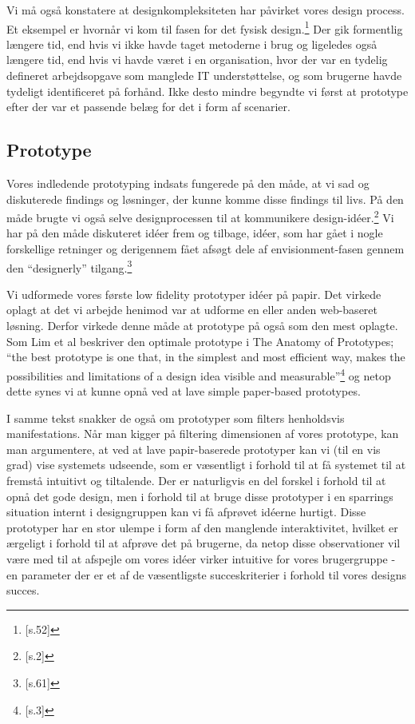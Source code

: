 Vi må også konstatere at designkompleksiteten har påvirket vores design process. Et eksempel er hvornår vi kom til fasen for det fysisk design.\footnote{\citep{Benyon}[s.52]} Der gik formentlig længere tid, end hvis vi ikke havde taget metoderne i brug og ligeledes også længere tid, end hvis vi havde været i en organisation, hvor der var en tydelig defineret arbejdsopgave som manglede IT understøttelse, og som brugerne havde tydeligt identificeret på forhånd. Ikke desto mindre begyndte vi først at prototype efter der var et passende belæg for det i form af scenarier.

\subsection{Prototype}
Vores indledende prototyping indsats fungerede på den måde, at vi sad og diskuterede findings og løsninger, der kunne komme disse findings til livs. På den måde brugte vi også selve designprocessen til at kommunikere design-idéer.\footnote{\citep{Lim}[s.2]} Vi har på den måde diskuteret idéer frem og tilbage, idéer, som har gået i nogle forskellige retninger og derigennem fået afsøgt dele af envisionment-fasen gennem den “designerly” tilgang.\footnote{\citep{Stolterman}[s.61]}

Vi udformede vores første low fidelity prototyper idéer på papir. Det virkede oplagt at det vi arbejde henimod var at udforme en eller anden web-baseret løsning. Derfor virkede denne måde at prototype på også som den mest oplagte. Som Lim et al beskriver den optimale prototype i The Anatomy of Prototypes; “the best prototype is one that, in the simplest and most efficient way, makes the possibilities and limitations of a design idea visible and measurable”\footnote{\citep{Lim}[s.3]} og netop dette synes vi at kunne opnå ved at lave simple paper-based prototypes. 

I samme tekst snakker de også om prototyper som filters henholdsvis manifestations. Når man kigger på filtering dimensionen af vores prototype, kan man argumentere, at ved at lave papir-baserede prototyper kan vi (til en vis grad) vise systemets udseende, som er væsentligt i forhold til at få systemet til at fremstå intuitivt og tiltalende. Der er naturligvis en del forskel i forhold til at opnå det gode design, men i forhold til at bruge disse prototyper i en sparrings situation internt i designgruppen kan vi få  afprøvet idéerne hurtigt. Disse prototyper har en stor ulempe i form af den manglende interaktivitet, hvilket er ærgeligt i forhold til at afprøve det på brugerne, da netop disse observationer vil være med til at afspejle om vores idéer virker intuitive for vores brugergruppe - en parameter der er et af de væsentligste succeskriterier i forhold til vores designs succes.

